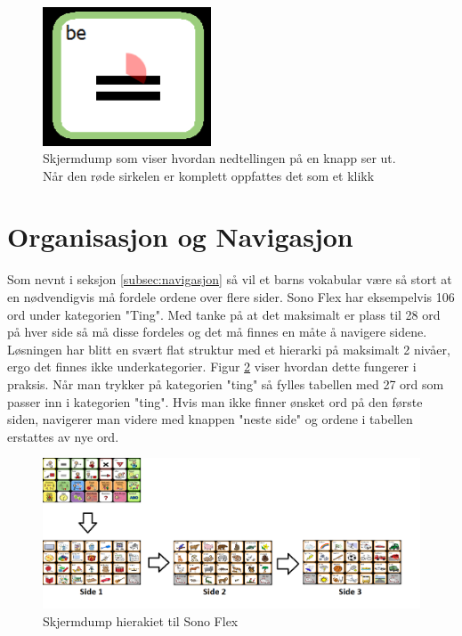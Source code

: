 \documentclass[phd,tocprelim]{cornell}
\begin{document}
\begin{figure}[ht!]
\centering
\includegraphics[width=50mm]{Knapp-interaksjon}
\caption{Skjermdump som viser hvordan nedtellingen på en knapp ser ut. Når den røde sirkelen er komplett oppfattes det som et klikk}
\label{fig:knapp-interaksjon}
\end{figure}


\section{Organisasjon og Navigasjon}

Som nevnt i seksjon \ref{subsec:navigasjon} så vil et barns vokabular være så stort at en nødvendigvis må fordele ordene over flere sider. Sono Flex har eksempelvis 106 ord under kategorien "Ting". Med tanke på at det maksimalt er plass til 28 ord på hver side så må disse fordeles og det må finnes en måte å navigere sidene. Løsningen har blitt en svært flat struktur med et hierarki på maksimalt 2 nivåer, ergo det finnes ikke underkategorier. Figur \ref{fig:hieraki-ting} viser hvordan dette fungerer i praksis. Når man trykker på kategorien "ting" så fylles tabellen med 27 ord som passer inn i kategorien "ting". Hvis man ikke finner ønsket ord på den første siden, navigerer man videre med knappen "neste side" og ordene i tabellen erstattes av nye ord. 


\begin{figure}[ht!]
\centering
\includegraphics[width=140mm]{Symbgrid}
\caption{Skjermdump hierakiet til Sono Flex}
\label{fig:hieraki-ting}
\end{figure}
\end{document}
